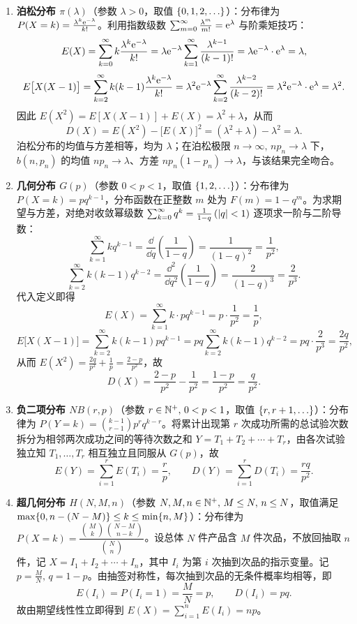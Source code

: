 \begin{enumerate}
  \item \textbf{泊松分布 $\pi(\lambda)$}（参数 $\lambda>0$，取值 $\{0,1,2,\ldots\}$）：分布律为 $P(X=k)=\frac{\lambda^k\mathrm{e}^{-\lambda}}{k!}$。利用指数级数 $\sum_{m=0}^{\infty}\frac{\lambda^m}{m!}=\mathrm{e}^\lambda$ 与阶乘矩技巧：
  \[
    E(X)=\sum_{k=0}^{\infty}k\frac{\lambda^k\mathrm{e}^{-\lambda}}{k!}
    =\lambda\mathrm{e}^{-\lambda}\sum_{k=1}^{\infty}\frac{\lambda^{k-1}}{(k-1)!}
    =\lambda\mathrm{e}^{-\lambda}\cdot\mathrm{e}^\lambda=\lambda,
  \]
  \[
    E\bigl[X(X-1)\bigr]=\sum_{k=2}^{\infty}k(k-1)\frac{\lambda^k\mathrm{e}^{-\lambda}}{k!}
    =\lambda^2\mathrm{e}^{-\lambda}\sum_{k=2}^{\infty}\frac{\lambda^{k-2}}{(k-2)!}
    =\lambda^2\mathrm{e}^{-\lambda}\cdot\mathrm{e}^\lambda=\lambda^2.
  \]
  因此 $E(X^2)=E[X(X-1)]+E(X)=\lambda^2+\lambda$，从而
  \[
    D(X)=E(X^2)-\bigl[E(X)\bigr]^2=(\lambda^2+\lambda)-\lambda^2=\lambda.
  \]
  泊松分布的均值与方差相等，均为 $\lambda$；在泊松极限 $n\to\infty,\,np_n\to\lambda$ 下，$b(n,p_n)$ 的均值 $np_n\to\lambda$、方差 $np_n(1-p_n)\to\lambda$，与该结果完全吻合。

  \item \textbf{几何分布 $G(p)$}（参数 $0<p<1$，取值 $\{1,2,\ldots\}$）：分布律为 $P(X=k)=pq^{k-1}$，分布函数在正整数 $m$ 处为 $F(m)=1-q^m$。为求期望与方差，对绝对收敛幂级数 $\sum_{k=0}^{\infty}q^k=\frac{1}{1-q}\,(\lvert q\rvert<1)$ 逐项求一阶与二阶导数：
  \[
    \sum_{k=1}^{\infty}kq^{k-1}=\frac{\dd}{\dd q}\left(\frac{1}{1-q}\right)=\frac{1}{(1-q)^2}=\frac{1}{p^2},
  \]
  \[
    \sum_{k=2}^{\infty}k(k-1)q^{k-2}=\frac{\dd^2}{\dd q^2}\left(\frac{1}{1-q}\right)=\frac{2}{(1-q)^3}=\frac{2}{p^3}.
  \]
  代入定义即得
  \[
    E(X)=\sum_{k=1}^{\infty}k\cdot pq^{k-1}=p\cdot\frac{1}{p^2}=\frac{1}{p},
  \]
  \[
    E\bigl[X(X-1)\bigr]=\sum_{k=2}^{\infty}k(k-1)pq^{k-1}=pq\sum_{k=2}^{\infty}k(k-1)q^{k-2}=pq\cdot\frac{2}{p^3}=\frac{2q}{p^2},
  \]
  从而 $E(X^2)=\frac{2q}{p^2}+\frac{1}{p}=\frac{2-p}{p^2}$，故
  \[
    D(X)=\frac{2-p}{p^2}-\frac{1}{p^2}=\frac{1-p}{p^2}=\frac{q}{p^2}.
  \]

  \item \textbf{负二项分布 $NB(r,p)$}（参数 $r\in\mathbb{N}^+,\,0<p<1$，取值 $\{r,r+1,\ldots\}$）：分布律为 $P(Y=k)=\binom{k-1}{r-1}p^r q^{k-r}$。将累计出现第 $r$ 次成功所需的总试验次数拆分为相邻两次成功之间的等待次数之和 $Y=T_1+T_2+\cdots+T_r$，由各次试验独立知 $T_1,\ldots,T_r$ 相互独立且同服从 $G(p)$，故
  \[
    E(Y)=\sum_{i=1}^{r}E(T_i)=\frac{r}{p},\qquad
    D(Y)=\sum_{i=1}^{r}D(T_i)=\frac{rq}{p^2}.
  \]

  \item \textbf{超几何分布 $H(N,M,n)$}（参数 $N,M,n\in\mathbb{N}^+,\,M\le N,\,n\le N$，取值满足 $\max\{0,n-(N-M)\}\le k\le\min\{n,M\}$）：分布律为 $P(X=k)=\dfrac{\binom{M}{k}\binom{N-M}{n-k}}{\binom{N}{n}}$。设总体 $N$ 件产品含 $M$ 件次品，不放回抽取 $n$ 件，记 $X=I_1+I_2+\cdots+I_n$，其中 $I_i$ 为第 $i$ 次抽到次品的指示变量。记 $p=\frac{M}{N},\,q=1-p$。由抽签对称性，每次抽到次品的无条件概率均相等，即
  \[
    E(I_i)=P(I_i=1)=\frac{M}{N}=p,\qquad
    D(I_i)=pq.
  \]
  故由期望线性性立即得到 $E(X)=\sum_{i=1}^{n}E(I_i)=np$。


\end{enumerate}
